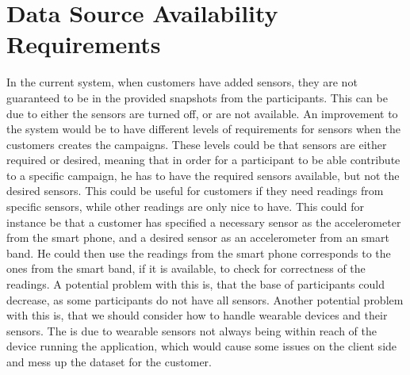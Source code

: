 
\newpage
\section{Data Source Availability Requirements}

In the current system, when customers have added sensors, they are not guaranteed to be in the provided snapshots from the participants. This can be due to either the sensors are turned off, or are not available. An improvement to the system would be to have different levels of requirements for sensors when the customers creates the campaigns. These levels could be that sensors are either required or desired, meaning that in order for a participant to be able contribute to a specific campaign, he has to have the required sensors available, but not the desired sensors. This could be useful for customers if they need readings from specific sensors, while other readings are only nice to have. This could for instance be that a customer has specified a necessary sensor as the accelerometer from the smart phone, and a desired sensor as an accelerometer from an smart band. He could then use the readings from the smart phone corresponds to the ones from the smart band, if it is available, to check for correctness of the readings. A potential problem with this is, that the base of participants could decrease, as some participants do not have all sensors. Another potential problem with this is, that we should consider how to handle wearable devices and their sensors. The is due to wearable sensors not always being within reach of the device running the application, which would cause some issues on the client side and mess up the dataset for the customer.

